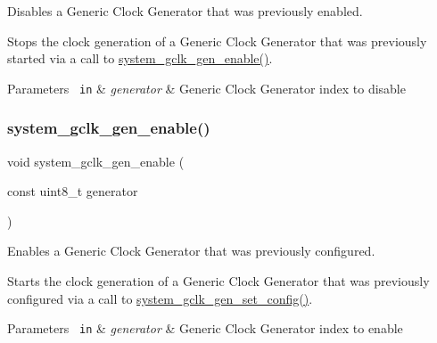Disables a Generic Clock Generator that was previously enabled. 

Stops the clock generation of a Generic Clock Generator that was previously started via a call to \mbox{\hyperlink{group__asfdoc__sam0__system__clock__group_ga2bad007fcf1f649a3919dcc72dccea8b}{system\+\_\+gclk\+\_\+gen\+\_\+enable()}}.


\begin{DoxyParams}[1]{Parameters}
\mbox{\texttt{ in}}  & {\em generator} & Generic Clock Generator index to disable \\
\hline
\end{DoxyParams}
\mbox{\label{group__asfdoc__sam0__system__clock__group_ga2bad007fcf1f649a3919dcc72dccea8b}} 
\subsubsection{\texorpdfstring{system\_gclk\_gen\_enable()}{system\_gclk\_gen\_enable()}}
{\footnotesize\ttfamily void system\+\_\+gclk\+\_\+gen\+\_\+enable (\begin{DoxyParamCaption}\item[{const uint8\+\_\+t}]{generator }\end{DoxyParamCaption})}



Enables a Generic Clock Generator that was previously configured. 

Starts the clock generation of a Generic Clock Generator that was previously configured via a call to \mbox{\hyperlink{group__asfdoc__sam0__system__clock__group_gacfd3360ccc8abb013f66b11ff44a5d0d}{system\+\_\+gclk\+\_\+gen\+\_\+set\+\_\+config()}}.


\begin{DoxyParams}[1]{Parameters}
\mbox{\texttt{ in}}  & {\em generator} & Generic Clock Generator index to enable \\
\hline
\end{DoxyParams}
\mbox{\label{group__asfdoc__sam0__system__clock__group_gaf5cd7b482ee14413084669c32eef84cb}} 
